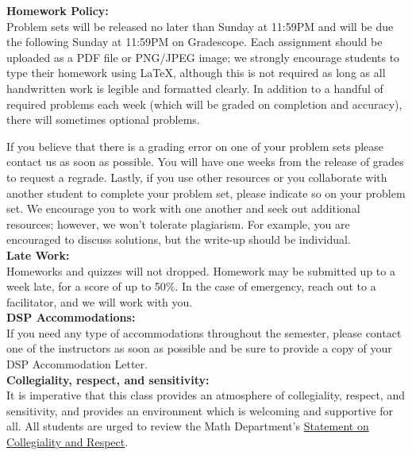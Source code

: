 \documentclass[11pt, a4paper]{article}
\begin{document}
\noindent\textbf{Homework Policy:} \\
Problem sets will be released no later than Sunday at 11:59PM and will be due the following Sunday at 11:59PM on Gradescope. Each assignment should be uploaded as a PDF file or PNG/JPEG image; we strongly encourage students to type their homework using \LaTeX{}, although this is not required as long as all handwritten work is legible and formatted clearly. In addition to a handful of required problems each week (which will be graded on completion and accuracy), there will sometimes optional problems.

If you believe that there is a grading error on one of your problem sets please contact us as soon as possible. You will have one weeks from the release of grades to request a regrade. Lastly, if you use other resources or you collaborate with another student to complete your problem set, please indicate so on your problem set. We encourage you to work with one another and seek out additional resources; however, we won’t tolerate plagiarism. For example, you are encouraged to discuss solutions, but the write-up should be individual. \\

\noindent\textbf{Late Work:} \\
Homeworks and quizzes will not dropped. Homework may be submitted up to a week late, for a score of up to 50\%. In the case of emergency, reach out to a facilitator, and we will work with you. \\

\noindent\textbf{DSP Accommodations:} \\
If you need any type of accommodations throughout the semester, please contact one of the instructors as soon as possible and be sure to provide a copy of your DSP Accommodation Letter. \\

\noindent\textbf{Collegiality, respect, and sensitivity:} \\
It is imperative that this class provides an atmosphere of collegiality, respect, and sensitivity, and provides an environment which is welcoming and supportive for all. All students are urged to review the Math Department's \href{https://math.berkeley.edu/about}{Statement on Collegiality and Respect}.
\end{document}
